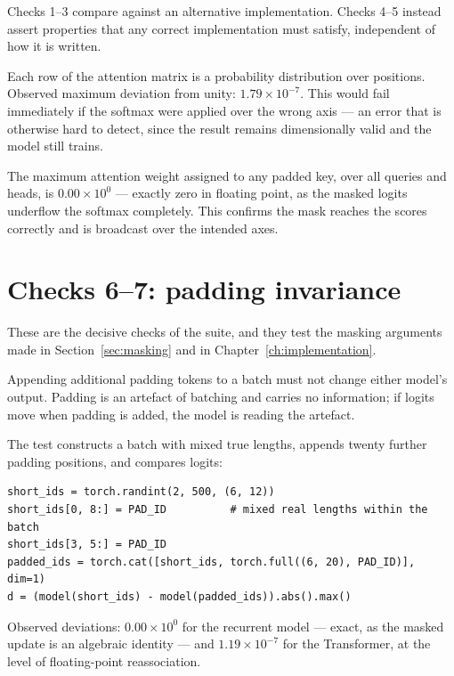 Checks 1--3 compare against an alternative implementation. Checks 4--5 instead assert properties
that any correct implementation must satisfy, independent of how it is written.

 Each row of the attention matrix is a probability
distribution over positions. Observed maximum deviation from unity: $1.79\times10^{-7}$. This would
fail immediately if the softmax were applied over the wrong axis --- an error that is otherwise
hard to detect, since the result remains dimensionally valid and the model still trains.

 The maximum attention weight assigned
to any padded key, over all queries and heads, is $0.00\times10^{0}$ --- exactly zero in floating
point, as the masked logits underflow the softmax completely. This confirms the mask reaches the
scores correctly and is broadcast over the intended axes.

\section{Checks 6--7: padding invariance}
\label{sec:padinv}

These are the decisive checks of the suite, and they test the masking arguments made in
Section~\ref{sec:masking} and in Chapter~\ref{ch:implementation}.

 Appending additional padding tokens to a batch must not change either
model's output. Padding is an artefact of batching and carries no information; if logits move when
padding is added, the model is reading the artefact.

The test constructs a batch with mixed true lengths, appends twenty further padding positions, and
compares logits:

{\small
\begin{verbatim}
short_ids = torch.randint(2, 500, (6, 12))
short_ids[0, 8:] = PAD_ID          # mixed real lengths within the batch
short_ids[3, 5:] = PAD_ID
padded_ids = torch.cat([short_ids, torch.full((6, 20), PAD_ID)], dim=1)
d = (model(short_ids) - model(padded_ids)).abs().max()
\end{verbatim}}

Observed deviations: $0.00\times10^{0}$ for the recurrent model --- exact, as the masked update is
an algebraic identity --- and $1.19\times10^{-7}$ for the Transformer, at the level of
floating-point reassociation.

